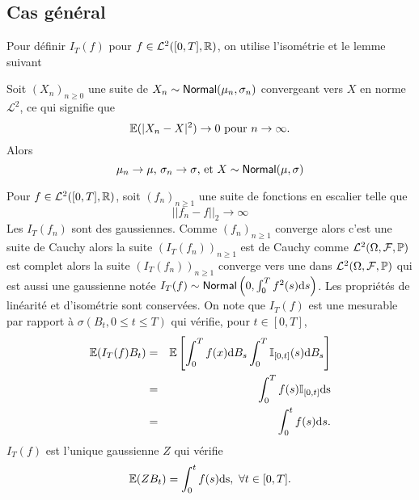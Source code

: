 \subsection{Cas général}
Pour définir $I_T(f)$ pour $f\in\mathcal{L}^2([0,T],\mathbb{R})$, on utilise l'isométrie et le lemme suivant 
\begin{lemma}
Soit $(X_n)_{n\geq0}$ une suite de \va $X_n\sim\mathsf{Normal}(\mu_n,\sigma_n)$ convergeant vers $X$ en norme $\mathcal{L}^2$, ce qui signifie que 
$$
\mathbb{E}(|X_n-X|^2)\rightarrow 0\text{ pour }n\rightarrow \infty.
$$
Alors 
$$
\mu_n\rightarrow\mu\text{, } \sigma_n\rightarrow\sigma\text{, et }X\sim\mathsf{Normal}(\mu,\sigma)
$$
\end{lemma}

Pour $f\in\mathcal{L}^2([0,T],\mathbb{R})$, soit $(f_n)_{n\geq 1}$ une suite de fonctions en escalier telle que 
$$
||f_n - f||_2\rightarrow\infty
$$
Les \va $I_T(f_n)$ sont des \va gaussiennes. Comme $(f_n)_{n\geq 1}$ converge alors c'est une suite de Cauchy alors la suite $(I_T(f_n))_{n\geq 1}$ est de Cauchy comme $\mathcal{L}^2(\Omega, \mathcal{F}, \mathbb{P})$ est complet alors la suite $(I_T(f_n))_{n\geq 1}$ converge vers une \va dans $\mathcal{L}^2(\Omega, \mathcal{F}, \mathbb{P})$ qui est aussi une \va gaussienne notée $I_T(f)\sim\mathsf{Normal}\left(0,\int_0^T f^2(s)\text{d}s\right)$. Les propriétés de linéarité et d'isométrie sont conservées. On note que $I_T(f)$ est une \va mesurable par rapport à $\sigma(B_t,0\leq t\leq T)$ qui vérifie, pour $t\in[0,T]$,
\begin{eqnarray*}
\mathbb{E}(I_T(f)B_t)& =& \mathbb{E}\left[\int_0^T f(x)\text{d}B_s\int_0^T \mathbb{I}_{[0,t]}(s)\text{d}B_s\right]\\
&=&\int_0^Tf(s)\mathbb{I}_{[0,t]}\text{ds}\\ 
&=& \int_0^t f(s)\text{d}s.
\end{eqnarray*}
$I_T(f)$ est l'unique \va gaussienne $Z$ qui vérifie 
$$
\mathbb{E}(ZB_t) = \int_0^tf(s)\text{ds},\text{ }\forall t\in[0,T].
$$

